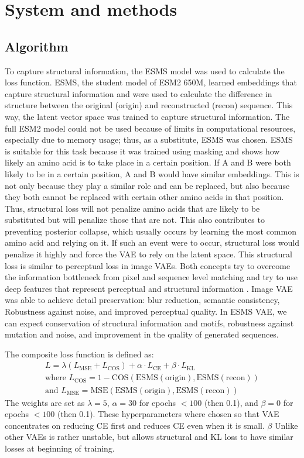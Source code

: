 \documentclass[unnumsec,webpdf,contemporary,medium]{oup-authoring-template}
\begin{document}
\section{System and methods}\label{sec:methods}
\subsection{Algorithm}\label{subsec:loss_arch}
To capture structural information, the ESMS model was used to calculate the loss function. ESMS, the student model of ESM2 650M, learned embeddings that capture structural information and were used to calculate the difference in structure between the original (origin) and reconstructed (recon) sequence. This way, the latent vector space was trained to capture structural information. The full ESM2 model could not be used because of limits in computational resources, especially due to memory usage; thus, as a substitute, ESMS was chosen.
ESMS is suitable for this task because it was trained using masking and shows how likely an amino acid is to take place in a certain position. If A and B were both likely to be in a certain position, A and B would have similar embeddings. This is not only because they play a similar role and can be replaced, but also because they both cannot be replaced with certain other amino acids in that position. Thus, structural loss will not penalize amino acids that are likely to be substituted but will penalize those that are not. This also contributes to preventing posterior collapse, which usually occurs by learning the most common amino acid and relying on it. If such an event were to occur, structural loss would penalize it highly and force the VAE to rely on the latent space. This structural loss is similar to perceptual loss in image VAEs. Both concepts try to overcome the information bottleneck from pixel and sequence level matching and try to use deep features that represent perceptual and structural information \cite{johnson2016perceptual}. Image VAE was able to achieve detail preservation: blur reduction, semantic consistency, Robustness against noise, and improved perceptual quality. In ESMS VAE, we can expect conservation of structural information and motifs, robustness against mutation and noise, and improvement in the quality of generated sequences.

The composite loss function is defined as:
\begin{gather}
L = \lambda (L_{\text{MSE}} + L_{\text{COS}}) + \alpha \cdot L_{\text{CE}} + \beta \cdot L_{\text{KL}} \\
\text{where } L_{\text{COS}} = 1 - \text{COS}(\text{ESMS}(\text{origin}), \text{ESMS}(\text{recon})) \nonumber \\
\text{and } L_{\text{MSE}} = \text{MSE}(\text{ESMS}(\text{origin}), \text{ESMS}(\text{recon})) \nonumber
\end{gather}
The weights are set as $\lambda=5$, $\alpha=30$ for epochs $< 100$ (then 0.1), and $\beta=0$ for epochs $< 100$ (then 0.1). These hyperparameters where chosen so that VAE concentrates on reducing CE first and reduces CE even when it is small. $\beta$ Unlike other VAEs is rather unstable, but allows structural and KL loss to have similar losses at beginning of training.
\end{document}

